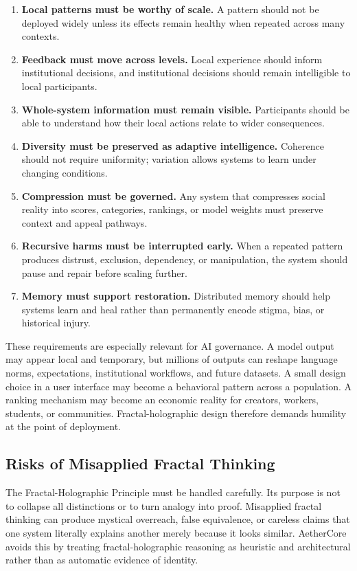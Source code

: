 \documentclass[12pt]{article}
\begin{document}
\begin{enumerate}
  \item \textbf{Local patterns must be worthy of scale.} A pattern should not be deployed widely unless its effects remain healthy when repeated across many contexts.
  \item \textbf{Feedback must move across levels.} Local experience should inform institutional decisions, and institutional decisions should remain intelligible to local participants.
  \item \textbf{Whole-system information must remain visible.} Participants should be able to understand how their local actions relate to wider consequences.
  \item \textbf{Diversity must be preserved as adaptive intelligence.} Coherence should not require uniformity; variation allows systems to learn under changing conditions.
  \item \textbf{Compression must be governed.} Any system that compresses social reality into scores, categories, rankings, or model weights must preserve context and appeal pathways.
  \item \textbf{Recursive harms must be interrupted early.} When a repeated pattern produces distrust, exclusion, dependency, or manipulation, the system should pause and repair before scaling further.
  \item \textbf{Memory must support restoration.} Distributed memory should help systems learn and heal rather than permanently encode stigma, bias, or historical injury.
\end{enumerate}

These requirements are especially relevant for AI governance. A model output may appear local and temporary, but millions of outputs can reshape language norms, expectations, institutional workflows, and future datasets. A small design choice in a user interface may become a behavioral pattern across a population. A ranking mechanism may become an economic reality for creators, workers, students, or communities. Fractal-holographic design therefore demands humility at the point of deployment.

\subsection{Risks of Misapplied Fractal Thinking}

The Fractal-Holographic Principle must be handled carefully. Its purpose is not to collapse all distinctions or to turn analogy into proof. Misapplied fractal thinking can produce mystical overreach, false equivalence, or careless claims that one system literally explains another merely because it looks similar. AetherCore avoids this by treating fractal-holographic reasoning as heuristic and architectural rather than as automatic evidence of identity.
\end{document}

